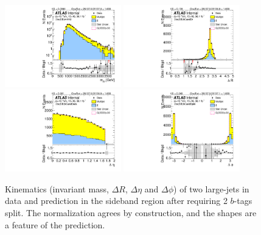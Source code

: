 \begin{figure}[htbp!]
\begin{center}
\includegraphics[width=0.45\textwidth,angle=-90]{figures/boosted/Sideband/b77_TwoTag_split_Sideband_mHH_l_1.pdf}
\includegraphics[width=0.45\textwidth,angle=-90]{figures/boosted/Sideband/b77_TwoTag_split_Sideband_hCandDr.pdf}\\
\includegraphics[width=0.45\textwidth,angle=-90]{figures/boosted/Sideband/b77_TwoTag_split_Sideband_hCandDeta.pdf}
\includegraphics[width=0.45\textwidth,angle=-90]{figures/boosted/Sideband/b77_TwoTag_split_Sideband_hCandDphi.pdf}
  \caption{Kinematics (invariant mass, $\Delta R$, $\Delta \eta$ and $\Delta \phi$) of two large-\R jets in data and prediction in the sideband region after requiring 2 $b$-tags split. The normalization agrees by construction, and the shapes are a feature of the prediction. }
  \label{fig:boosted-2bs-sideband-ak10-system}
\end{center}
\end{figure}

